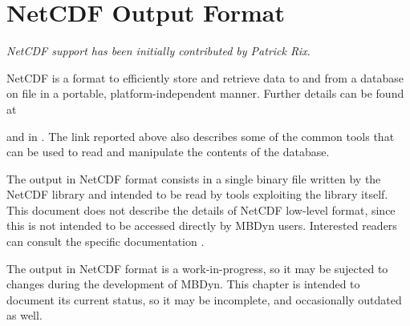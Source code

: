 %
%
%
%
%
% 
%
%

\chapter{NetCDF Output Format}
\label{sec:NETCDF}

\emph{NetCDF support has been initially contributed by Patrick Rix.}

NetCDF is a format to efficiently store and retrieve data to and from
a database on file in a portable, platform-independent manner.
Further details can be found at
\begin{quote}
\end{quote}
and in \cite{NETCDF-UM}.
The link reported above also describes some of the common tools
that can be used to read and manipulate the contents of the database.

The output in NetCDF format consists in a single binary file
written by the NetCDF library and intended to be read by tools
exploiting the library itself.
This document does not describe the details of NetCDF low-level format,
since this is not intended to be accessed directly by MBDyn users.
Interested readers can consult the specific documentation \cite{NETCDF-UM}.

The output in NetCDF format is a work-in-progress, so it may be sujected
to changes during the development of MBDyn.
This chapter is intended to document its current status,
so it may be incomplete, and occasionally outdated as well.



